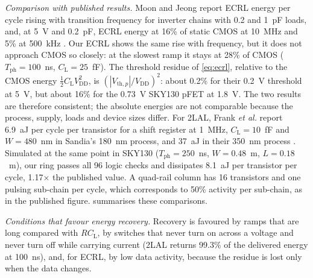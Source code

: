 \documentclass[conference]{IEEEtran}
\newcommand{\VDD}{V_{\mathrm{DD}}}
\newcommand{\CL}{C_{\mathrm{L}}}
\newcommand{\Tph}{T_{\mathrm{ph}}}
\begin{document}
\emph{Comparison with published results.} Moon and Jeong report ECRL energy
per cycle rising with transition frequency for inverter chains with 0.2 and
1~pF loads, and, at 5~V and 0.2~pF, ECRL energy at 16\% of static CMOS at
10~MHz and 5\% at 500~kHz \cite{moon1996}. Our ECRL shows the same rise with
frequency, but it does not approach CMOS so closely: at the slowest ramp it
stays at 28\% of CMOS ($\Tph=100$~ns, $\CL=25$~fF). The threshold residue of
\cref{eq:ecrl}, relative to the CMOS energy $\tfrac12\CL\VDD^2$, is
$(|V_{\mathrm{th},p}|/\VDD)^2$: about 0.2\% for their 0.2~V threshold at 5~V,
but about 16\% for the 0.73~V SKY130 pFET at 1.8~V. The two results are
therefore consistent; the absolute energies are not comparable because the
process, supply, loads and device sizes differ. For 2LAL, Frank \emph{et al.} report
6.9~aJ per cycle per transistor for a shift register at 1~MHz,
$\CL=10$~fF and $W=480$~nm in Sandia's 180~nm process, and 37~aJ in their
350~nm process \cite{frank2020talk}. Simulated at the same point in SKY130
($\Tph=250$~ns, $W=0.48$~\textmu m, $L=0.18$~\textmu m), our ring passes all 96
logic checks and dissipates 8.1~aJ per transistor per cycle, 1.17$\times$ the
published value. A quad-rail column has 16 transistors and one pulsing
sub-chain per cycle, which corresponds to 50\% activity per sub-chain, as in
the published figure.  summarises these comparisons.

\emph{Conditions that favour energy recovery.} Recovery is favoured by ramps
that are long compared with $R\CL$, by switches that never turn on across a
voltage and never turn off while carrying current (2LAL returns 99.3\% of the
delivered energy at 100~ns), and, for ECRL, by low data activity, because the
residue is lost only when the data changes.
\end{document}
